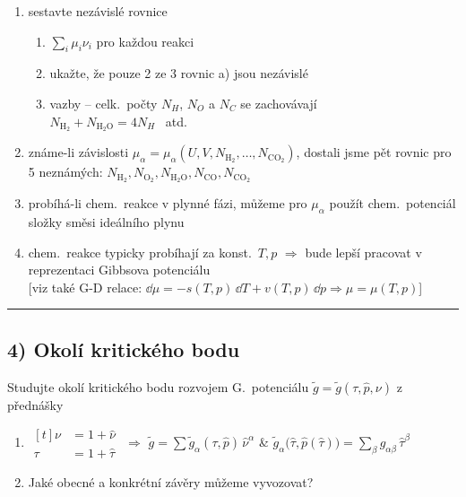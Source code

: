 {\color{NavyBlue}
\begin{enumerate}[label=\arabic*)]
  \item sestavte nezávislé rovnice
  \begin{enumerate}[label=\alph*)]
    \item $\sum_i\mu_i\nu_i$ pro každou reakci
    \item ukažte, že pouze 2 ze 3 rovnic a) jsou nezávislé
    \item vazby -- celk.\ počty $N_H$, $N_O$ a $N_C$ se zachovávají \\
          $N_{\mathrm{H}_2} + N_{\mathrm{H}_2\mathrm{O}} = 4N_H$ \ atd.
  \end{enumerate}
  \item známe-li závislosti $\mu_\alpha = \mu_\alpha(U, V, N_{\mathrm{H}_2},\dots,N_{\mathrm{CO}_2})$, dostali jsme pět rovnic pro 5 neznámých:
        $N_{\mathrm{H}_2}, N_{\mathrm{O}_2}, N_{\mathrm{H}_2\mathrm{O}}, N_{\mathrm{CO}}, N_{\mathrm{CO}_2}$
  \item probíhá-li chem.\ reakce v plynné fázi, můžeme pro $\mu_\alpha$ použít chem.\ potenciál složky směsi ideálního plynu
  \item chem.\ reakce typicky probíhají za konst.\ $T, p$ $\Rightarrow$ bude lepší pracovat v reprezentaci Gibbsova potenciálu \\
        {[}viz také G-D relace: $\dd\mu = -s(T,p)\,\dd T + v(T,p)\,\dd p \Rightarrow \mu = \mu(T,p)${]}
\end{enumerate}}

\noindent\rule{\linewidth}{0.4pt}

\subsection*{4) Okolí kritického bodu}
\begin{priklad}[Příklad 4]
Studujte okolí kritického bodu rozvojem G.\ potenciálu $\tilde g = \tilde g(\tau,\hat p,\nu)$ z přednášky 
\end{priklad}
{\color{NavyBlue}
\begin{enumerate}[label=\arabic*)]
  \item $\begin{aligned}[t] \nu &= 1 + \hat\nu \\ \tau &= 1 + \hat\tau \end{aligned}$
        \quad $\Rightarrow$ \quad $\tilde g = \sum\tilde g_\alpha(\tau,\hat p)\,\hat\nu^\alpha$ \quad \& \quad
        $\tilde g_\alpha\big(\hat\tau,\hat p(\hat\tau)\big) = \sum_\beta g_{\alpha\beta}\,\hat\tau^\beta$
  \item Jaké obecné a konkrétní závěry můžeme vyvozovat?
\end{enumerate}}
